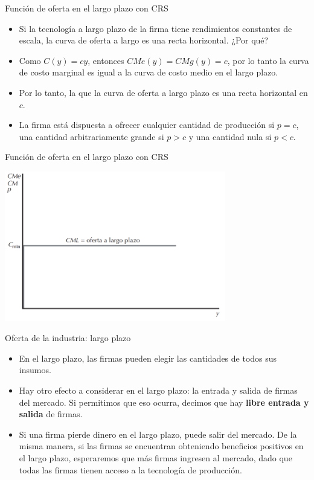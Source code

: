 \documentclass{beamer}
\theoremstyle{definition}
\begin{document}
\begin{frame}{Funci\'on de oferta en el largo plazo con CRS}
\begin{itemize}
\item Si la tecnología a largo plazo de la firma tiene rendimientos constantes de escala, la curva de oferta a largo es una recta horizontal. ¿Por qué?

\item Como $C(y)=cy$, entonces $CMe(y)=CMg(y)=c$, por lo tanto la curva de costo marginal es igual a la curva de costo medio en el largo plazo. %

\item Por lo tanto, la que la curva de oferta a
largo plazo es una recta horizontal en $c$.
\item La firma está dispuesta a ofrecer cualquier
cantidad de producción si $p = c$, una cantidad arbitrariamente grande si $p > c$ y una cantidad nula si $p < c$.
\end{itemize}
\end{frame}

\begin{frame}{Funci\'on de oferta en el largo plazo con CRS}
\begin{center}
\includegraphics[width=3.8in]{figures4/RCSLP.png}
\end{center}
\end{frame}


\begin{frame}{Oferta de la industria: largo plazo}
    \begin{itemize}
        \item En el largo plazo, las firmas pueden elegir las cantidades de todos sus insumos.
        \item Hay otro efecto a considerar en el largo plazo: la entrada y salida de firmas del mercado. Si permitimos que eso ocurra, decimos que hay \textbf{libre entrada y salida} de firmas.
        \item Si una firma pierde dinero en el largo plazo, puede salir del mercado. De la misma manera, si las firmas se encuentran obteniendo beneficios positivos en el largo plazo, esperaremos que más firmas ingresen al mercado, dado que todas las firmas tienen acceso a la tecnología de producción.
    \end{itemize}
\end{frame}
\end{document}
